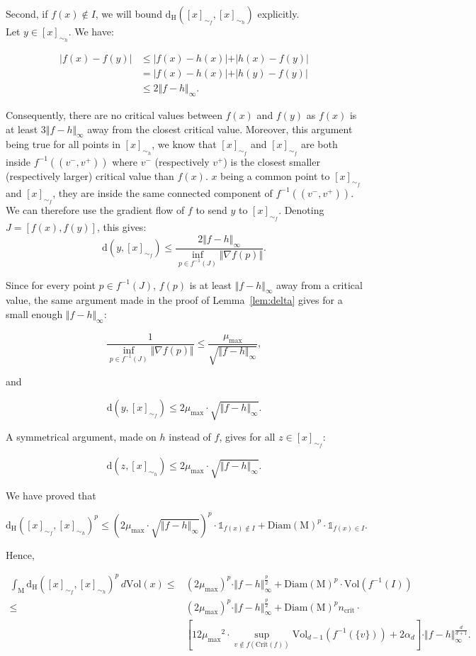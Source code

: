 \documentclass[pdflatex,sn-mathphys-ay]{sn-jnl}%
\newcommand{\man}{\mathrm{M}}
\newcommand{\dis}{\mathrm{d}}
\newcommand{\critic}{{\mathrm {Crit}}}
\newcommand{\haus}{{\mathrm {d_H}}}
\newcommand{\diam}{\mathrm{Diam}}
\newcommand{\vol}{\mathrm{Vol}}
\newcommand{\ind}{\mathds{1}}
\newcommand{\preim}[2]{#1^{-1}(#2)}
\newcommand{\mub}{{\mu_{\text{max}}}}
\newcommand{\crib}{{n_{\text{crit}}}}
\newcommand{\inorm}[1]{\Vert #1\Vert_\infty}
\newcommand{\ff}{h}
\theoremstyle{thmstyleone}%
\begin{document}
\begin{appendices}
Second, if $f(x)\notin I$, we will bound $\haus([x]_{\sim_f},[x]_{\sim_\ff})$ explicitly.\\
Let $y\in[x]_{\sim_\ff}$. We have:

\begin{align*}
\vert f(x)-f(y) \vert &\leq \vert f(x)-\ff(x) \vert + \vert \ff(x)-f(y) \vert\\
&= \vert f(x)-\ff(x) \vert + \vert \ff(y)-f(y) \vert\\
&\leq 2\inorm{f-\ff}.
\end{align*}

Consequently, there are no critical values between $f(x)$ and $f(y)$ as $f(x)$ is at least $3\inorm{f-\ff}$ away from the closest critical value. Moreover, this argument being true for all points in $[x]_{\sim_\ff}$, we know that $[x]_{\sim_f}$ and $[x]_{\sim_f}$ are both inside $\preim{f}{(v^-,v^+)}$ where $v^-$ (respectively $v^+$) is the closest smaller (respectively larger) critical value than $f(x)$. $x$ being a common point to $[x]_{\sim_f}$ and $[x]_{\sim_f}$, they are inside the same connected component of $\preim{f}{(v^-,v^+)}$. We can therefore use the gradient flow of $f$ to send $y$ to $[x]_{\sim_f}$. Denoting $J=[f(x),f(y)]$, this gives:
$$\dis(y,[x]_{\sim_f})\leq \frac{2\inorm{f-\ff}}{\inf_{p\in \preim{f}{J}}\Vert\nabla f(p)\Vert}.$$

Since for every point $p\in\preim{f}{J}$, $f(p)$ is at least $\inorm{f-\ff}$ away from a critical value, the same argument made in the proof of Lemma~\ref{lem:delta} gives for a small enough $\inorm{f-\ff}$:

$$\frac{1}{\inf_{p\in \preim{f}{J}}\Vert\nabla f(p)\Vert}\leq \frac{\mub}{\sqrt{\inorm{f-\ff}}},$$

and 

$$\dis(y,[x]_{\sim_f})\leq 2\mub\cdot \sqrt{\inorm{f-\ff}}.$$

A symmetrical argument, made on $\ff$ instead of $f$, gives for all $z\in[x]_{\sim_f}$:

$$\dis(z,[x]_{\sim_\ff})\leq 2\mub\cdot \sqrt{\inorm{f-\ff}}.$$

We have proved that

$$\haus([x]_{\sim_f},[x]_{\sim_\ff})^p\leq \left(2\mub\cdot \sqrt{\inorm{f-\ff}}\right)^p\cdot\ind_{f(x)\notin I}+\diam(\man)^p\cdot\ind_{f(x)\in I}.$$

Hence,

\begin{align*}
\int_\man\haus([x]_{\sim_f},[x]_{\sim_\ff})^p\,d\vol(x)\leq& (2\mub)^p\cdot \inorm{f-\ff}^{\frac{p}{2}} + \diam(\man)^p\cdot\vol\left(\preim{f}{I}\right)\\
\leq& (2\mub)^p\cdot \inorm{f-\ff}^{\frac{p}{2}} +\diam(\man)^p\crib\cdot\\
&\left[12\mub^2\cdot\sup_{v\notin f(\critic(f))}\vol_{d-1}\left(\preim{f}{\{v\}}\right)+2\alpha_d\right]\cdot\inorm{f-\ff}^{\frac{d}{d+1}}.
\end{align*}




\end{appendices}
\end{document}
